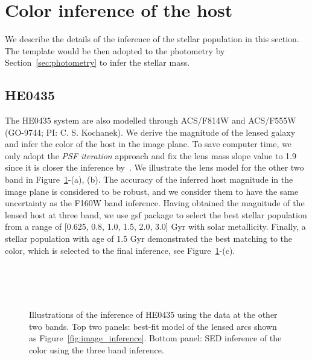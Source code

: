 \documentclass[fleqn,usenatbib]{mnras}
\begin{document}

\appendix

\section{Color inference of the host}
We describe the details of the inference of the stellar population in this section. The template would be then adopted to the photometry by Section~\ref{sec:photometry} to infer the stellar mass.
\subsection{HE0435}\label{app:HE0435}
The HE0435 system are also modelled through ACS/F814W and ACS/F555W (GO-9744; PI: C. S. Kochanek). We derive the magnitude of the lensed galaxy and infer the color of the host in the image plane. To save computer time, we only adopt the {\it PSF iteration} approach and fix the lens mass slope value to 1.9 since it is closer the inference by~\citet[][i.e., $\gamma\sim1.93$]{Wong2017}. We illustrate the lens model for the other two band in Figure~\ref{fig:app_HE0435}-(a), (b). The accuracy of the inferred host magnitude in the image plane is considered to be robust, and we consider them to have the same uncertainty as the F160W band inference. Having obtained the magnitude of the lensed host at three band, we use {\sc gsf} package to select the best stellar population from a range of [0.625, 0.8, 1.0, 1.5, 2.0, 3.0] Gyr with solar metallicity. Finally, a stellar population with age of 1.5 Gyr demonstrated the best matching to the color, which is selected to the final inference, see Figure~\ref{fig:app_HE0435}-(c).


\begin{figure}
\centering
{}\\
\\
\\
\caption{\label{fig:app_HE0435} 
Illustrations of the inference of HE0435 using the data at the other two bands. Top two panels: best-fit model of the lensed arcs shown as Figure~\ref{fig:image_inference}. Bottom panel: SED inference of the color using the three band inference.}
\end{figure} 
\end{document}
